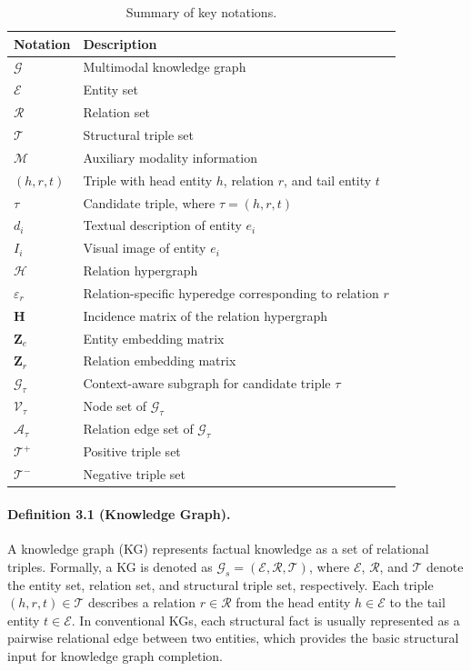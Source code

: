 \documentclass[a4paper,fleqn]{cas-sc}
\begin{document}
\begin{table}[t]
\centering
\caption{Summary of key notations.}
\label{tab:notations}
\begin{tabular}{ll}
\toprule
\textbf{Notation} & \textbf{Description} \\
\midrule
$\mathcal{G}$ & Multimodal knowledge graph \\
$\mathcal{E}$ & Entity set \\
$\mathcal{R}$ & Relation set \\
$\mathcal{T}$ & Structural triple set \\
$\mathcal{M}$ & Auxiliary modality information \\
$(h,r,t)$ & Triple with head entity $h$, relation $r$, and tail entity $t$ \\
$\tau$ & Candidate triple, where $\tau=(h,r,t)$ \\
$d_i$ & Textual description of entity $e_i$ \\
$I_i$ & Visual image of entity $e_i$ \\
$\mathcal{H}$ & Relation hypergraph \\
$\varepsilon_r$ & Relation-specific hyperedge corresponding to relation $r$ \\
$\mathbf{H}$ & Incidence matrix of the relation hypergraph \\
$\mathbf{Z}_{e}$ & Entity embedding matrix \\
$\mathbf{Z}_{r}$ & Relation embedding matrix \\
$\mathcal{G}_{\tau}$ & Context-aware subgraph for candidate triple $\tau$ \\
$\mathcal{V}_{\tau}$ & Node set of $\mathcal{G}_{\tau}$ \\
$\mathcal{A}_{\tau}$ & Relation edge set of $\mathcal{G}_{\tau}$ \\
$\mathcal{T}^{+}$ & Positive triple set \\
$\mathcal{T}^{-}$ & Negative triple set \\
\bottomrule
\end{tabular}
\end{table}

\paragraph{Definition 3.1 (Knowledge Graph).}
A knowledge graph (KG) represents factual knowledge as a set of relational triples. Formally, a KG is denoted as $\mathcal{G}_{s}=(\mathcal{E},\mathcal{R},\mathcal{T})$, where $\mathcal{E}$, $\mathcal{R}$, and $\mathcal{T}$ denote the entity set, relation set, and structural triple set, respectively. Each triple $(h,r,t)\in\mathcal{T}$ describes a relation $r\in\mathcal{R}$ from the head entity $h\in\mathcal{E}$ to the tail entity $t\in\mathcal{E}$. In conventional KGs, each structural fact is usually represented as a pairwise relational edge between two entities, which provides the basic structural input for knowledge graph completion.
\end{document}
